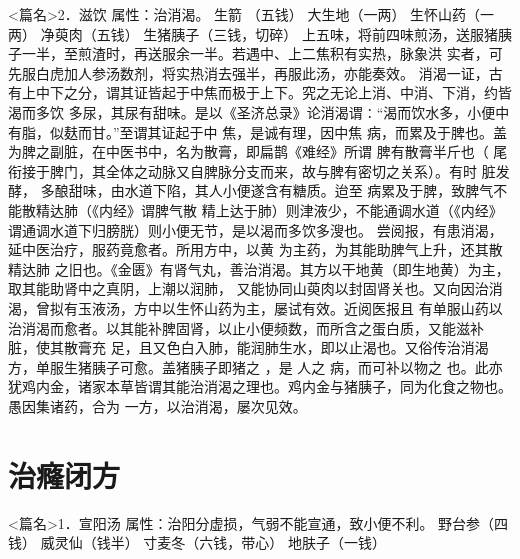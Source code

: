 \documentclass[a4paper,12pt,UTF8,twoside]{ctexbook}
\begin{document}
<篇名>2．滋饮
属性：治消渴。 
生箭 （五钱） 大生地（一两） 生怀山药（一两） 净萸肉（五钱） 生猪胰子（三钱，切碎） 
上五味，将前四味煎汤，送服猪胰子一半，至煎渣时，再送服余一半。若遇中、上二焦积有实热，脉象洪 
实者，可先服白虎加人参汤数剂，将实热消去强半，再服此汤，亦能奏效。 
消渴一证，古有上中下之分，谓其证皆起于中焦而极于上下。究之无论上消、中消、下消，约皆渴而多饮 
多尿，其尿有甜味。是以《圣济总录》论消渴谓∶“渴而饮水多，小便中有脂，似麸而甘。”至谓其证起于中 
焦，是诚有理，因中焦 病，而累及于脾也。盖 为脾之副脏，在中医书中，名为散膏，即扁鹊《难经》所谓 
脾有散膏半斤也（ 尾衔接于脾门，其全体之动脉又自脾脉分支而来，故与脾有密切之关系）。有时 脏发酵， 
多酿甜味，由水道下陷，其人小便遂含有糖质。迨至 病累及于脾，致脾气不能散精达肺（《内经》谓脾气散 
精上达于肺）则津液少，不能通调水道（《内经》谓通调水道下归膀胱）则小便无节，是以渴而多饮多溲也。 
尝阅报，有患消渴，延中医治疗，服药竟愈者。所用方中，以黄 为主药，为其能助脾气上升，还其散精达肺 
之旧也。《金匮》有肾气丸，善治消渴。其方以干地黄（即生地黄）为主，取其能助肾中之真阴，上潮以润肺， 
又能协同山萸肉以封固肾关也。又向因治消渴，曾拟有玉液汤，方中以生怀山药为主，屡试有效。近阅医报且 
有单服山药以治消渴而愈者。以其能补脾固肾，以止小便频数，而所含之蛋白质，又能滋补 脏，使其散膏充 
足，且又色白入肺，能润肺生水，即以止渴也。又俗传治消渴方，单服生猪胰子可愈。盖猪胰子即猪之 ，是 
人之 病，而可补以物之 
也。此亦犹鸡内金，诸家本草皆谓其能治消渴之理也。鸡内金与猪胰子，同为化食之物也。愚因集诸药，合为 
一方，以治消渴，屡次见效。 

\chapter{治癃闭方}
<篇名>1．宣阳汤
属性：治阳分虚损，气弱不能宣通，致小便不利。 
野台参（四钱） 威灵仙（钱半） 寸麦冬（六钱，带心） 地肤子（一钱） 
\end{document}
